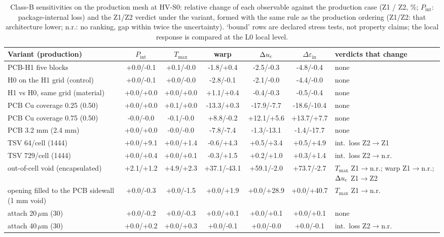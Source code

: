 \begin{table}[!t]
\caption{Class-B sensitivities on the production mesh at HV-S0: relative change of each observable against the production case (Z1 / Z2, \%; $P_{\mathrm{int}}$: package-internal loss) and the Z1/Z2 verdict under the variant, formed with the same rule as the production ordering (Z1/Z2: that architecture lower; n.r.: no ranking, gap within twice the uncertainty). `bound' rows are declared stress tests, not property claims; the local response is compared at the L0 local level.}
\label{tab:classb}
\centering
\scriptsize
\setlength{\tabcolsep}{2.0pt}
\begin{tabular}{@{}L{3.5cm}cccccL{3.9cm}@{}}
\toprule
Variant (production) & $P_{\mathrm{int}}$ & $T_{\max}$ & warp & $\Delta u_{\mathrm{c}}$ & $\Delta\varepsilon_{\mathrm{in}}$ & verdicts that change \\
\midrule
PCB-H1 five blocks & +0.0/-0.1 & +0.1/-0.0 & -1.8/+0.4 & -2.5/-0.3 & -4.8/-0.4 & none \\
H0 on the H1 grid (control) & +0.0/-0.1 & +0.0/-0.0 & -2.8/-0.1 & -2.1/-0.0 & -4.4/-0.0 & none \\
H1 vs H0, same grid (material) & +0.0/+0.0 & +0.0/+0.0 & +1.1/+0.4 & -0.4/-0.3 & -0.5/-0.4 & none \\
PCB Cu coverage 0.25 (0.50) & +0.0/+0.0 & +0.1/+0.0 & -13.3/+0.3 & -17.9/-7.7 & -18.6/-10.4 & none \\
PCB Cu coverage 0.75 (0.50) & -0.0/-0.0 & -0.1/-0.0 & +8.8/-0.2 & +12.1/+5.6 & +13.7/+7.7 & none \\
PCB 3.2 mm (2.4 mm) & +0.0/+0.0 & -0.0/-0.0 & -7.8/-7.4 & -1.3/-13.1 & -1.4/-17.7 & none \\
TSV 64/cell (1444) & +0.0/+9.1 & +0.0/+1.4 & -0.6/+4.3 & +0.5/+3.4 & +0.5/+4.9 & int.\ loss Z2$\to$Z1 \\
TSV 729/cell (1444) & +0.0/+0.4 & +0.0/+0.1 & -0.3/+1.5 & +0.2/+1.0 & +0.3/+1.4 & int.\ loss Z2$\to$n.r. \\
out-of-cell void (encapsulated) & +2.1/+1.2 & +4.9/+2.3 & +37.1/-43.1 & +59.1/-2.0 & +73.7/-2.7 & $T_{\max}$ Z1$\to$n.r.; warp Z1$\to$n.r.; $\Delta u_{\mathrm{c}}$ Z1$\to$Z2 \\
opening filled to the PCB sidewall (1 mm void) & +0.0/-0.3 & +0.0/-1.5 & +0.0/+1.9 & +0.0/+28.9 & +0.0/+40.7 & $T_{\max}$ Z1$\to$n.r. \\
attach 20\,$\mu$m (30) & +0.0/-0.2 & +0.0/-0.3 & +0.0/+0.1 & +0.0/+0.1 & +0.0/+0.1 & none \\
attach 40\,$\mu$m (30) & +0.0/+0.2 & +0.0/+0.3 & +0.0/-0.1 & +0.0/-0.0 & +0.0/-0.1 & int.\ loss Z2$\to$n.r. \\

\end{tabular}
\end{table}
